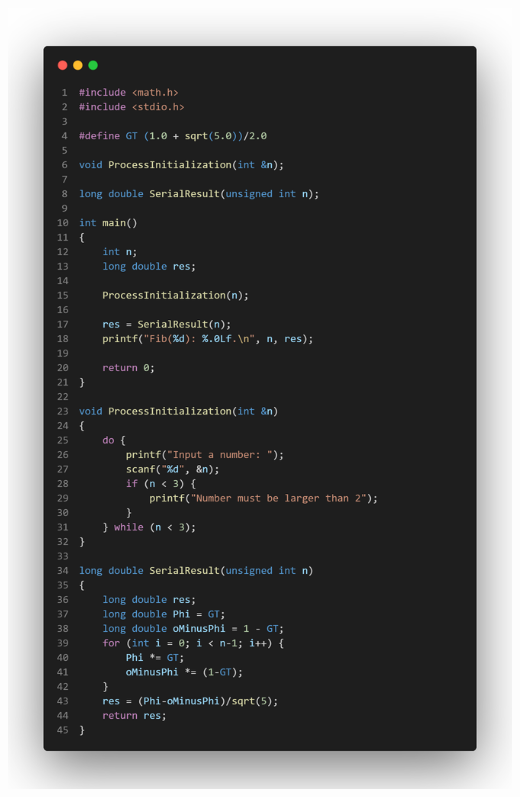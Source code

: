\documentclass[12pt,a4paper]{report}
\begin{document}
\begin{center}
	\includegraphics[trim=0in 0in 0in 16.5in, clip, scale=0.35]{./Photos/Fibonacci/Serial.PNG}
\end{center}
\end{document}
